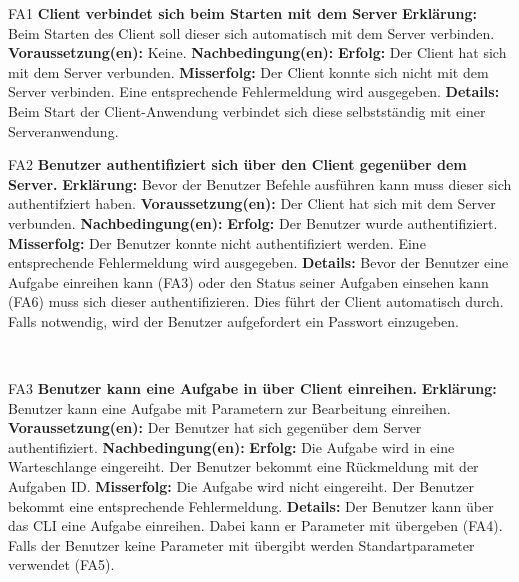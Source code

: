 \documentclass[a4paper,12pt]{article}
\begin{document}
\begin{itemize}[nosep]
	\leftskip=0.5cm
	\begin{minipage}[t]{\linewidth}
		\item[FA1] \textbf{\gls{Client} verbindet sich beim Starten mit dem Server}
		\subitem \textbf{Erklärung:} Beim Starten des \gls{Client} soll dieser sich automatisch mit dem \gls{Server} verbinden.
		\subitem \textbf{Voraussetzung(en):} Keine.
		\subitem \textbf{Nachbedingung(en):}
		\subsubitem \textbf{Erfolg:} Der \gls{Client} hat sich mit dem \gls{Server} verbunden.
		\subsubitem \textbf{Misserfolg:} Der \gls{Client} konnte sich nicht mit dem \gls{Server} verbinden. Eine entsprechende Fehlermeldung wird ausgegeben.
		\subitem \textbf{Details:} Beim Start der Client-Anwendung verbindet sich diese selbstständig mit einer Serveranwendung.
	\end{minipage}
	\pagebreak
	
	\begin{minipage}[t]{\linewidth}
		\item[FA2] \textbf{Benutzer authentifiziert sich über den \gls{Client} gegenüber dem Server.}
		\subitem \textbf{Erklärung:} Bevor der Benutzer Befehle ausführen kann muss dieser sich authentifziert haben.
		\subitem \textbf{Voraussetzung(en):} Der Client hat sich mit dem Server verbunden.
		\subitem \textbf{Nachbedingung(en):} 
		\subsubitem \textbf{Erfolg:} Der \gls{Benutzer} wurde authentifiziert.
		\subsubitem \textbf{Misserfolg:} Der \gls{Benutzer} konnte nicht authentifiziert werden. Eine entsprechende Fehlermeldung wird ausgegeben.
		\subitem \textbf{Details:} Bevor der Benutzer eine Aufgabe einreihen kann (FA3) oder den Status seiner Aufgaben einsehen kann (FA6) muss sich dieser authentifizieren. Dies führt der Client automatisch durch. Falls notwendig, wird der \gls{Benutzer} aufgefordert ein Passwort einzugeben.
	\end{minipage}
    \newline
    \\
    
    \begin{minipage}[t] {\linewidth}
    	\item[FA3] \textbf{Benutzer kann eine Aufgabe in über \gls{Client} einreihen.}
    	\subitem \textbf{Erklärung:} Benutzer kann eine Aufgabe mit Parametern zur Bearbeitung einreihen.
    	\subitem \textbf{Voraussetzung(en):} Der \gls{Benutzer} hat sich gegenüber dem \gls{Server} authentifiziert.
    	\subitem \textbf{Nachbedingung(en):}
    	\subsubitem \textbf{Erfolg:} Die Aufgabe wird in eine Warteschlange eingereiht. Der \gls{Benutzer} bekommt eine Rückmeldung mit der Aufgaben ID.
    	\subsubitem \textbf{Misserfolg:} Die Aufgabe wird nicht eingereiht. Der Benutzer bekommt eine entsprechende Fehlermeldung.
    	\subitem \textbf{Details:} Der \gls{Benutzer} kann über das \gls{CLI} eine Aufgabe einreihen. Dabei kann er Parameter mit übergeben (FA4). Falls der Benutzer keine Parameter mit übergibt werden Standartparameter verwendet (FA5).
   \end{minipage}
   \newline
   \\
	

\end{itemize}
\end{document}
